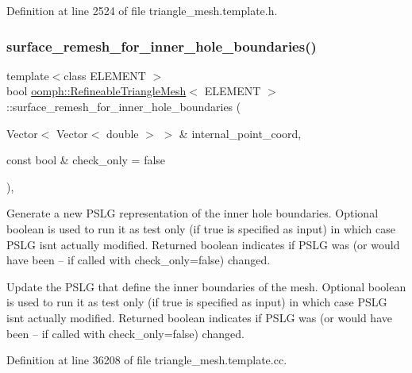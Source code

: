 Definition at line 2524 of file triangle\+\_\+mesh.\+template.\+h.

\mbox{\label{classoomph_1_1RefineableTriangleMesh_a7189d208a062fda132f6fa814e4385cf}} 
\subsubsection{\texorpdfstring{surface\+\_\+remesh\+\_\+for\+\_\+inner\+\_\+hole\+\_\+boundaries()}{surface\_remesh\_for\_inner\_hole\_boundaries()}}
{\footnotesize\ttfamily template$<$class E\+L\+E\+M\+E\+NT $>$ \\
bool \hyperlink{classoomph_1_1RefineableTriangleMesh}{oomph\+::\+Refineable\+Triangle\+Mesh}$<$ E\+L\+E\+M\+E\+NT $>$\+::surface\+\_\+remesh\+\_\+for\+\_\+inner\+\_\+hole\+\_\+boundaries (\begin{DoxyParamCaption}\item[{Vector$<$ Vector$<$ double $>$ $>$ \&}]{internal\+\_\+point\+\_\+coord,  }\item[{const bool \&}]{check\+\_\+only = {\ttfamily false} }\end{DoxyParamCaption})\hspace{0.3cm}{\ttfamily [protected]}, {\ttfamily [virtual]}}



Generate a new P\+S\+LG representation of the inner hole boundaries. Optional boolean is used to run it as test only (if true is specified as input) in which case P\+S\+LG isn\textquotesingle{}t actually modified. Returned boolean indicates if P\+S\+LG was (or would have been -- if called with check\+\_\+only=false) changed. 

Update the P\+S\+LG that define the inner boundaries of the mesh. Optional boolean is used to run it as test only (if true is specified as input) in which case P\+S\+LG isn\textquotesingle{}t actually modified. Returned boolean indicates if P\+S\+LG was (or would have been -- if called with check\+\_\+only=false) changed. 

Definition at line 36208 of file triangle\+\_\+mesh.\+template.\+cc.



